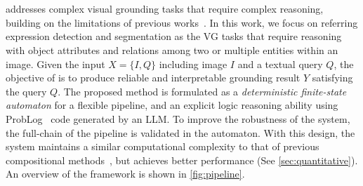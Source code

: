 \section{\methodname{}}
\label{sec:method}

\methodname{} addresses complex visual grounding tasks that require complex reasoning, building on the limitations of previous works~\cite{gupta_visual_2023, suris_vipergpt_2023, lu_chameleon_2023, ke_hydra_2024}. In this work, we focus on referring expression detection and segmentation as the VG tasks that require reasoning with object attributes and relations among two or multiple entities within an image. Given the input $X=\{I, Q\}$ including image $I$ and a textual query $Q$, the objective of \methodname{} is to produce reliable and interpretable grounding result $Y$ satisfying the query $Q$. The proposed method is formulated as a \emph{deterministic finite-state automaton} for a flexible pipeline, and an explicit logic reasoning ability using ProbLog~\cite{de_raedt_problog_2007} code generated by an LLM. To improve the robustness of the system, the full-chain of the pipeline is validated in the automaton. With this design, the system maintains a similar computational complexity to that of previous compositional methods~\cite{ke_hydra_2024}, but achieves better performance (See \autoref{sec:quantitative}). An overview of the framework is shown in \autoref{fig:pipeline}.

